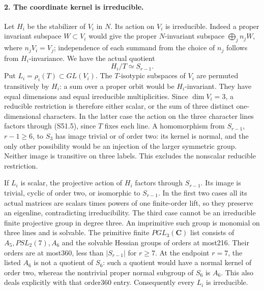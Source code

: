 \paragraph{2. The coordinate kernel is irreducible.}
Let \(H_i\) be the stabilizer of \(V_i\) in \(N\).
Its action on \(V_i\) is irreducible. Indeed a proper
invariant subspace \(W\subset V_i\) would give the proper
\(N\)-invariant subspace \(\bigoplus_j n_jW\), where
\(n_jV_i=V_j\); independence of each summand from the choice
of \(n_j\) follows from \(H_i\)-invariance. We have the
actual quotient
\[
                         H_i/T\simeq S_{r-1}.              \tag{S51.5}
\]
Put \(L_i=\rho_i(T)\subset GL(V_i)\). The \(T\)-isotypic
subspaces of \(V_i\) are permuted transitively by \(H_i\):
a sum over a proper orbit would be \(H_i\)-invariant. They
have equal dimensions and equal irreducible multiplicities.
Since \(\dim V_i=3\), a reducible restriction is therefore
either scalar, or the sum of three distinct one-dimensional
characters. In the latter case the action on the three character
lines factors through (S51.5), since \(T\) fixes each line.
A homomorphism from \(S_{r-1}\), \(r-1\ge6\), to \(S_3\)
has image trivial or of order two: its kernel is normal, and
the only other possibility would be an injection of the larger
symmetric group. Neither image is transitive on three labels.
This excludes the nonscalar reducible restriction.

If \(L_i\) is scalar, the projective action of \(H_i\)
factors through \(S_{r-1}\). Its image is trivial, cyclic of
order two, or isomorphic to \(S_{r-1}\). In the first two
cases all its actual matrices are scalars times powers of one
finite-order lift, so they preserve an eigenline, contradicting
irreducibility. The third case cannot be an irreducible finite
projective group in degree three. An imprimitive such group is
monomial on three lines and is solvable. The primitive finite
\(PGL_3(\mathbf C)\) list consists of \(A_5,PSL_2(7),A_6\)
and the solvable Hessian groups of orders at most216. Their
orders are at most360, less than \(|S_{r-1}|\) for \(r\ge7\).
At the endpoint \(r=7\), the listed \(A_6\) is not a
quotient of \(S_6\): such a quotient would have a normal
kernel of order two, whereas the nontrivial proper normal
subgroup of \(S_6\) is \(A_6\). This also deals explicitly
with that order360 entry. Consequently every \(L_i\) is
irreducible.


